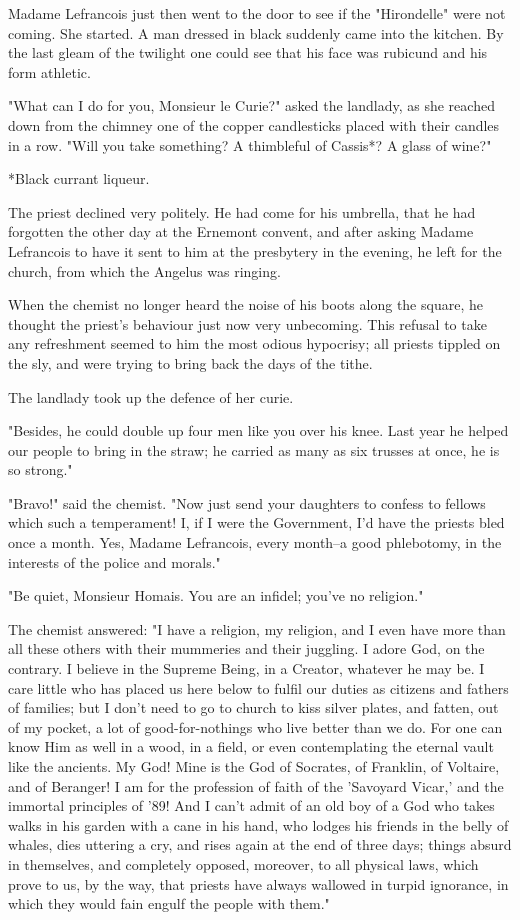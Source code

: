 \documentclass[11pt,twocolumn]{ltugboat}
\begin{document}
Madame Lefrancois just then went to the door to see if the "Hirondelle"
were not coming. She started. A man dressed in black suddenly came into
the kitchen. By the last gleam of the twilight one could see that his
face was rubicund and his form athletic.

"What can I do for you, Monsieur le Curie?" asked the landlady, as she
reached down from the chimney one of the copper candlesticks placed
with their candles in a row. "Will you take something? A thimbleful of
Cassis*? A glass of wine?"

     *Black currant liqueur.

The priest declined very politely. He had come for his umbrella, that
he had forgotten the other day at the Ernemont convent, and after
asking Madame Lefrancois to have it sent to him at the presbytery in the
evening, he left for the church, from which the Angelus was ringing.

When the chemist no longer heard the noise of his boots along the
square, he thought the priest's behaviour just now very unbecoming. This
refusal to take any refreshment seemed to him the most odious hypocrisy;
all priests tippled on the sly, and were trying to bring back the days
of the tithe.

The landlady took up the defence of her curie.

"Besides, he could double up four men like you over his knee. Last year
he helped our people to bring in the straw; he carried as many as six
trusses at once, he is so strong."

"Bravo!" said the chemist. "Now just send your daughters to confess to
fellows which such a temperament! I, if I were the Government, I'd have
the priests bled once a month. Yes, Madame Lefrancois, every month--a
good phlebotomy, in the interests of the police and morals."

"Be quiet, Monsieur Homais. You are an infidel; you've no religion."

The chemist answered: "I have a religion, my religion, and I even have
more than all these others with their mummeries and their juggling.
I adore God, on the contrary. I believe in the Supreme Being, in a
Creator, whatever he may be. I care little who has placed us here below
to fulfil our duties as citizens and fathers of families; but I don't
need to go to church to kiss silver plates, and fatten, out of my
pocket, a lot of good-for-nothings who live better than we do. For one
can know Him as well in a wood, in a field, or even contemplating the
eternal vault like the ancients. My God! Mine is the God of Socrates, of
Franklin, of Voltaire, and of Beranger! I am for the profession of faith
of the 'Savoyard Vicar,' and the immortal principles of '89! And I can't
admit of an old boy of a God who takes walks in his garden with a
cane in his hand, who lodges his friends in the belly of whales, dies
uttering a cry, and rises again at the end of three days; things absurd
in themselves, and completely opposed, moreover, to all physical laws,
which prove to us, by the way, that priests have always wallowed in
turpid ignorance, in which they would fain engulf the people with them."
\end{document}
